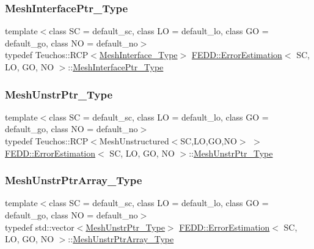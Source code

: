 \subsubsection{\texorpdfstring{Mesh\+Interface\+Ptr\+\_\+\+Type}{MeshInterfacePtr\_Type}}
{\footnotesize\ttfamily template$<$class SC  = default\+\_\+sc, class LO  = default\+\_\+lo, class GO  = default\+\_\+go, class NO  = default\+\_\+no$>$ \\
typedef Teuchos\+::\+R\+CP$<$\hyperlink{classFEDD_1_1ErrorEstimation_a11fff10f0a859ff6a2bef01b0ac73943}{Mesh\+Interface\+\_\+\+Type}$>$ \hyperlink{classFEDD_1_1ErrorEstimation}{F\+E\+D\+D\+::\+Error\+Estimation}$<$ SC, LO, GO, NO $>$\+::\hyperlink{classFEDD_1_1ErrorEstimation_aa6871369b5b28e20aac7c7178cdde50e}{Mesh\+Interface\+Ptr\+\_\+\+Type}}

\mbox{\label{classFEDD_1_1ErrorEstimation_a862043dc355a1524640b5ef53e8eefa1}} 
\subsubsection{\texorpdfstring{Mesh\+Unstr\+Ptr\+\_\+\+Type}{MeshUnstrPtr\_Type}}
{\footnotesize\ttfamily template$<$class SC  = default\+\_\+sc, class LO  = default\+\_\+lo, class GO  = default\+\_\+go, class NO  = default\+\_\+no$>$ \\
typedef Teuchos\+::\+R\+CP$<$Mesh\+Unstructured$<$SC,LO,GO,NO$>$ $>$ \hyperlink{classFEDD_1_1ErrorEstimation}{F\+E\+D\+D\+::\+Error\+Estimation}$<$ SC, LO, GO, NO $>$\+::\hyperlink{classFEDD_1_1ErrorEstimation_a862043dc355a1524640b5ef53e8eefa1}{Mesh\+Unstr\+Ptr\+\_\+\+Type}}

\mbox{\label{classFEDD_1_1ErrorEstimation_ad64dcc59dd00c37ff85f641e52644916}} 
\subsubsection{\texorpdfstring{Mesh\+Unstr\+Ptr\+Array\+\_\+\+Type}{MeshUnstrPtrArray\_Type}}
{\footnotesize\ttfamily template$<$class SC  = default\+\_\+sc, class LO  = default\+\_\+lo, class GO  = default\+\_\+go, class NO  = default\+\_\+no$>$ \\
typedef std\+::vector$<$\hyperlink{classFEDD_1_1ErrorEstimation_a862043dc355a1524640b5ef53e8eefa1}{Mesh\+Unstr\+Ptr\+\_\+\+Type}$>$ \hyperlink{classFEDD_1_1ErrorEstimation}{F\+E\+D\+D\+::\+Error\+Estimation}$<$ SC, LO, GO, NO $>$\+::\hyperlink{classFEDD_1_1ErrorEstimation_ad64dcc59dd00c37ff85f641e52644916}{Mesh\+Unstr\+Ptr\+Array\+\_\+\+Type}}

